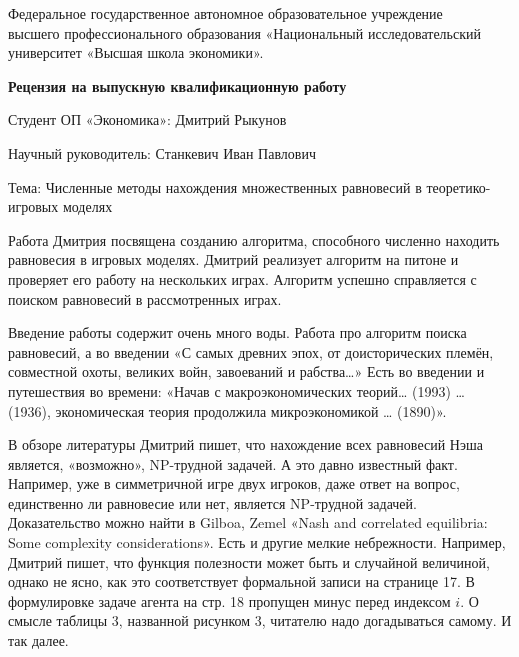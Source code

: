 \documentclass[a4paper, 12pt]{article}
\begin{document}
\begin{center}
{\small Федеральное государственное автономное образовательное учреждение\\ 
высшего профессионального образования «Национальный исследовательский\\ 
университет «Высшая школа экономики».}
\end{center}

\vspace{0.4cm}

\begin{center}
\textbf{Рецензия на выпускную квалификационную работу}
\end{center}

\vspace{0.4cm}

Студент ОП «Экономика»: Дмитрий Рыкунов

\vspace{0.4cm}

Научный руководитель: Станкевич Иван Павлович

\vspace{0.4cm}

Тема: Численные методы нахождения множественных равновесий в теоретико-игровых
моделях

\vspace{1cm}

Работа Дмитрия посвящена созданию алгоритма, способного численно
находить равновесия в игровых моделях. Дмитрий реализует алгоритм на
питоне и проверяет его работу на нескольких играх. Алгоритм успешно
справляется с поиском равновесий в рассмотренных играх.

Введение работы содержит очень много воды. Работа про алгоритм поиска
равновесий, а во введении «С самых древних эпох, от доисторических
племён, совместной охоты, великих войн, завоеваний и рабства\ldots{}»
Есть во введении и путешествия во времени: «Начав с макроэкономических
теорий\ldots{} (1993) \ldots{} (1936), экономическая теория продолжила
микроэкономикой \ldots{} (1890)».

В обзоре литературы Дмитрий пишет, что нахождение всех равновесий Нэша
является, «возможно», NP-трудной задачей. А это давно известный факт.
Например, уже в симметричной игре двух игроков, даже ответ на вопрос,
единственно ли равновесие или нет, является NP-трудной задачей.
Доказательство можно найти в Gilboa, Zemel «Nash and correlated
equilibria: Some complexity considerations». Есть и другие мелкие
небрежности. Например, Дмитрий пишет, что функция полезности может быть
и случайной величиной, однако не ясно, как это соответствует формальной
записи на странице 17. В формулировке задаче агента на стр. 18 пропущен
минус перед индексом \(i\). О смысле таблицы 3, названной рисунком 3,
читателю надо догадываться самому. И так далее.
\end{document}
